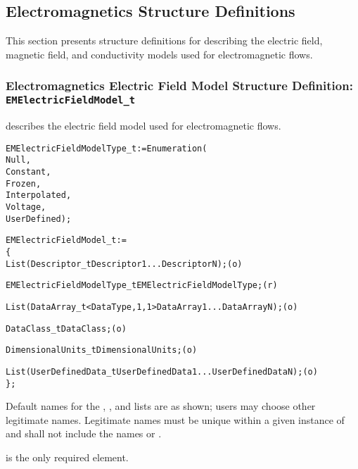 \subsection{Electromagnetics Structure Definitions}
\label{s:EM}

This section presents structure definitions for describing the electric
field, magnetic field, and conductivity models used for electromagnetic
flows.

\subsubsection{Electromagnetics Electric Field Model Structure Definition: \texttt{EMElectricFieldModel\_t}}

 describes the electric field model used
for electromagnetic flows.
\begin{alltt}
  EMElectricFieldModelType\_t := Enumeration(
    Null,
    Constant,
    Frozen,
    Interpolated,
    Voltage,
    UserDefined ) ;
\end{alltt}

\begin{alltt}
  EMElectricFieldModel\_t :=
    \{
    List( Descriptor\_t Descriptor1 ... DescriptorN ) ;                      (o)

    EMElectricFieldModelType\_t EMElectricFieldModelType ;                   (r)
    
    List( DataArray\_t<DataType, 1, 1> DataArray1 ... DataArrayN ) ;         (o)

    DataClass\_t DataClass ;                                                 (o)
                
    DimensionalUnits\_t DimensionalUnits ;                                   (o)

    List( UserDefinedData\_t UserDefinedData1 ... UserDefinedDataN ) ;       (o)
    \} ;
\end{alltt}

\begin{notes}
\item Default names for the , , and
      lists are as shown; users may choose other legitimate names.
      Legitimate names must be unique within a given instance of
       and shall not include the names
       or .
\item {} is the only required element.
\end{notes}

